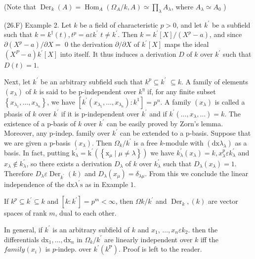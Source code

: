 (Note that $\operatorname{Der}_{k}(A)=\operatorname{Hom}_{A}\left(\Omega_{A} / k, A\right) \simeq \prod_{\lambda} A_{\lambda}$, where $A_{\lambda} \simeq A_{0}$ )

(26.F) Example 2. Let $k$ be a field of characteristic $p>0$, and let $k^{\prime}$ be a subfield such that $k=k^{\dagger}(t), t^{p}=a \varepsilon k^{\prime}$ $t \neq k^{\prime}$. Then $k=k^{\prime}[X] /\left(X^{p}-a\right)$, and since $\partial\left(X^{p}-a\right) / \partial X=$ 0 the derivation $\partial / \partial X$ of $k^{\prime}[X]$ maps the ideal $\left(X^{P}-a\right) k^{\prime}[X]$ into itself. It thus induces a derivation $D$ of $k$ over $k^{\prime}$ such that $D(t)=1$.

Next, let $k^{\prime}$ be an arbitrary subfield such that $k^{p} \subseteq k^{\prime}$ $\subseteq k$. A family of elements $\left(x_{\lambda}\right)$ of $k$ is said to be p-independent over $k^{\eta}$ if, for any finite subset $\left\{x_{\lambda_{1}}, \ldots, x_{\lambda_{n}}\right\}$, we have $\left[k^{\prime}\left(x_{\lambda_{1}}, \ldots, x_{\lambda_{n}}\right): k^{1}\right]=p^{n}$. A family $\left(x_{\lambda}\right)$ is called a pbasis of $k$ over $k^{\prime}$ if it is p-independent over $k^{\prime}$ and if $k^{\prime}\left(\ldots, x_{\lambda}, \ldots\right)=k$. The existence of a p-basis of $k$ over $k^{\prime}$ can be easily proved by Zorn's lemma. Moreover, any p-indep. family over $k^{\prime}$ can be extended to a p-basis. Suppose that we are given a p-basis $\left(x_{\lambda}\right)$. Then $\Omega_{k} / k^{\prime}$ is a free $k$-module with $\left(\mathrm{dx} \lambda_{\lambda}\right)$ as a basis. In fact, putting $\mathrm{k}_{\lambda}^{\prime}=\mathrm{k}^{\prime}\left(\left\{\mathrm{x}_{\mu} \mid \mu \neq \lambda\right\}\right)$ we have $k_{\lambda}^{\prime}\left(x_{\lambda}\right)=k, x_{\lambda}^{p} \varepsilon k_{\lambda}^{\prime}$ and $x_{\lambda} \notin k_{\lambda}^{\prime}$, so there exists a derivation $D_{\lambda}$ of $k$ over $k_{\lambda}^{\prime}$ such that $D_{\lambda}\left(x_{\lambda}\right)=1$. Therefore $D_{\lambda} \varepsilon \operatorname{Der}_{k^{\prime}}(k)$ and $D_{\lambda}\left(x_{\mu}\right)=\delta_{\lambda \mu}$. From this we conclude the linear independence of the $\mathrm{dx} \lambda^{\prime} \mathrm{s}$ as in Example $1 .$

If $k^{p} \subseteq k^{\prime} \subseteq k$ and $\left[k: k^{\prime}\right]=p^{m}<\infty$, then $\Omega k / k^{\prime}$ and $\operatorname{Der}_{k},(k)$ are vector spaces of rank $m$, dual to each other.

In general, if $k^{\prime}$ is an arbitrary subfield of $k$ and $x_{1}$, $\ldots, x_{n} \varepsilon k_{2}$. then the differentials $\mathrm{dx}_{1}, \ldots, \mathrm{d} \mathrm{x}_{n}$ in $\Omega_{k} / k^{\prime}$ are linearly independent over $k$ iff the $f a m i l y\left(x_{i}\right)$ is $p$-indep. over $k^{\prime}\left(k^{\mathrm{P}}\right)$. Proof is left to the reader.

